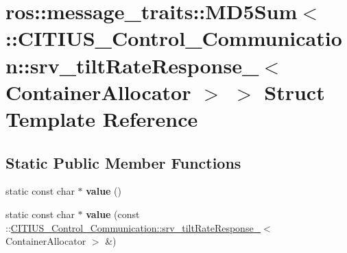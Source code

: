 \hypertarget{structros_1_1message__traits_1_1_m_d5_sum_3_01_1_1_c_i_t_i_u_s___control___communication_1_1srv_7236414a409ea97f3aefceaf59d7e3b5}{\section{ros\-:\-:message\-\_\-traits\-:\-:\-M\-D5\-Sum$<$ \-:\-:\-C\-I\-T\-I\-U\-S\-\_\-\-Control\-\_\-\-Communication\-:\-:srv\-\_\-tilt\-Rate\-Response\-\_\-$<$ \-Container\-Allocator $>$ $>$ \-Struct \-Template \-Reference}
\label{structros_1_1message__traits_1_1_m_d5_sum_3_01_1_1_c_i_t_i_u_s___control___communication_1_1srv_7236414a409ea97f3aefceaf59d7e3b5}
}
\subsection*{\-Static \-Public \-Member \-Functions}
\begin{DoxyCompactItemize}
\item 
\hypertarget{structros_1_1message__traits_1_1_m_d5_sum_3_01_1_1_c_i_t_i_u_s___control___communication_1_1srv_7236414a409ea97f3aefceaf59d7e3b5_a23bee0179b9258e8a4276326e9adc28f}{static const char $\ast$ {\bfseries value} ()}\label{structros_1_1message__traits_1_1_m_d5_sum_3_01_1_1_c_i_t_i_u_s___control___communication_1_1srv_7236414a409ea97f3aefceaf59d7e3b5_a23bee0179b9258e8a4276326e9adc28f}

\item 
\hypertarget{structros_1_1message__traits_1_1_m_d5_sum_3_01_1_1_c_i_t_i_u_s___control___communication_1_1srv_7236414a409ea97f3aefceaf59d7e3b5_a9b2ce5fa8c3d0ea6dd18bae1dd708257}{static const char $\ast$ {\bfseries value} (const \-::\hyperlink{struct_c_i_t_i_u_s___control___communication_1_1srv__tilt_rate_response__}{\-C\-I\-T\-I\-U\-S\-\_\-\-Control\-\_\-\-Communication\-::srv\-\_\-tilt\-Rate\-Response\-\_\-}$<$ \-Container\-Allocator $>$ \&)}\label{structros_1_1message__traits_1_1_m_d5_sum_3_01_1_1_c_i_t_i_u_s___control___communication_1_1srv_7236414a409ea97f3aefceaf59d7e3b5_a9b2ce5fa8c3d0ea6dd18bae1dd708257}

\end{DoxyCompactItemize}
